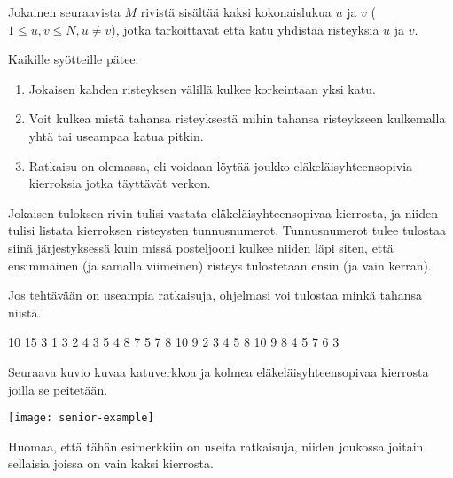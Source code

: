 \documentclass{boi2014-fi}
\begin{document}
    Jokainen seuraavista $M$ rivistä sisältää kaksi kokonaislukua $u$ ja $v$
    ($1 \le u, v \le N, u \neq v$), jotka tarkoittavat että katu yhdistää
    risteyksiä $u$ ja $v$.

    Kaikille syötteille pätee:
    \begin{enumerate}
        \item Jokaisen kahden risteyksen välillä kulkee korkeintaan yksi katu.
        \item Voit kulkea mistä tahansa risteyksestä mihin tahansa risteykseen
            kulkemalla yhtä tai useampaa katua pitkin.
        \item Ratkaisu on olemassa, eli voidaan löytää joukko eläkeläisyhteensopivia
            kierroksia jotka täyttävät verkon.
    \end{enumerate}
    
    \Output
    Jokaisen tuloksen rivin tulisi vastata eläkeläisyhteensopivaa kierrosta, ja
    niiden tulisi listata kierroksen risteysten tunnusnumerot. Tunnusnumerot
    tulee tulostaa siinä järjestyksessä kuin missä posteljooni kulkee niiden
    läpi siten, että ensimmäinen (ja samalla viimeinen) risteys tulostetaan ensin
    (ja vain kerran).

    Jos tehtävään on useampia ratkaisuja, ohjelmasi voi tulostaa minkä tahansa
    niistä.

    \Example

    \example
    {
        10 15  3  1 3  2 4  3 5  4 8  7  5 7  8  10  9
    }
    {
        2 3 4 5 8 10 9  8 4  5 7 6 3
    }
    {
        Seuraava kuvio kuvaa katuverkkoa ja kolmea eläkeläisyhteensopivaa
        kierrosta joilla se peitetään.

        \texttt{[image: senior-example]}

        Huomaa, että tähän esimerkkiin on useita ratkaisuja, niiden joukossa
        joitain sellaisia joissa on vain kaksi kierrosta.
    }
\end{document}
